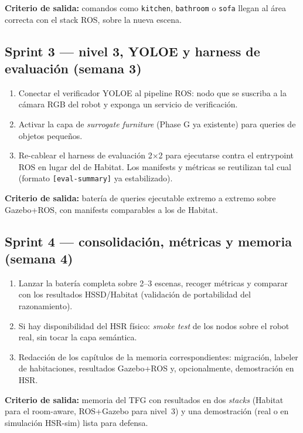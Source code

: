 \documentclass[11pt,a4paper]{article}
\begin{document}
\textbf{Criterio de salida:} comandos como \texttt{kitchen}, \texttt{bathroom}
o \texttt{sofa} llegan al área correcta con el stack ROS, sobre la nueva escena.

\subsection*{Sprint 3 --- nivel 3, YOLOE y harness de evaluación (semana 3)}
\begin{enumerate}
  \item Conectar el verificador YOLOE al pipeline ROS: nodo que se suscriba a
        la cámara RGB del robot y exponga un servicio de verificación.
  \item Activar la capa de \emph{surrogate furniture} (Phase G ya existente)
        para queries de objetos pequeños.
  \item Re-cablear el harness de evaluación 2$\times$2 para ejecutarse contra
        el entrypoint ROS en lugar del de Habitat. Los manifests y métricas se
        reutilizan tal cual (formato \texttt{[eval-summary]} ya estabilizado).
\end{enumerate}

\textbf{Criterio de salida:} batería de queries ejecutable extremo a extremo
sobre Gazebo+ROS, con manifests comparables a los de Habitat.

\subsection*{Sprint 4 --- consolidación, métricas y memoria (semana 4)}
\begin{enumerate}
  \item Lanzar la batería completa sobre 2--3 escenas, recoger métricas y
        comparar con los resultados HSSD/Habitat (validación de portabilidad
        del razonamiento).
  \item Si hay disponibilidad del HSR físico: \emph{smoke test} de los nodos
        sobre el robot real, sin tocar la capa semántica.
  \item Redacción de los capítulos de la memoria correspondientes: migración,
        labeler de habitaciones, resultados Gazebo+ROS y, opcionalmente,
        demostración en HSR.
\end{enumerate}

\textbf{Criterio de salida:} memoria del TFG con resultados en dos
\emph{stacks} (Habitat para el room-aware, ROS+Gazebo para nivel~3) y una
demostración (real o en simulación HSR-sim) lista para defensa.
\end{document}
